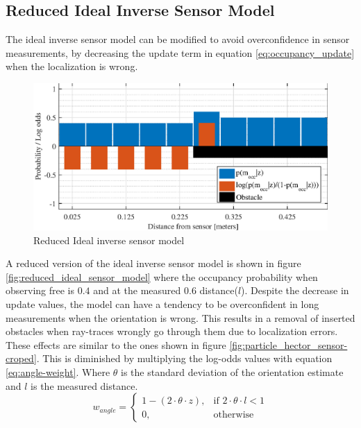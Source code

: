 \subsection{Reduced Ideal Inverse Sensor Model}
\label{sec:reduced_ideal_sensor_model}
The ideal inverse sensor model can be modified to avoid overconfidence in sensor measurements, by decreasing the update term in equation \ref{eq:occupancy_update} when the localization is wrong. 

\begin{figure}[htbp]
	\centering
	\includegraphics[scale=1]{figures/static_mapping/reduced_ideal_sensor_model}
	\caption{Reduced Ideal inverse sensor model}
	\label{fig:reduced_ideal_sensor_model}
\end{figure}

A reduced version of the ideal inverse sensor model is shown in figure \vref{fig:reduced_ideal_sensor_model} where the occupancy probability when observing free is $0.4$ and at the measured $0.6$ distance($l$). 
Despite the decrease in update values, the model can have a tendency to be overconfident in long measurements when the orientation is wrong.
This results in a removal of inserted obstacles when ray-traces wrongly go through them due to localization errors.
These effects are similar to the ones shown in figure \ref{fig:particle_hector_sensor-croped}.
This is diminished by multiplying the log-odds values with equation \vref{eq:angle-weight}.
Where \(\theta \) is the standard deviation of the orientation estimate and \(l\) is the measured distance.
\begin{equation}
\label{eq:angle-weight}
w_{angle} = 
\begin{cases}
1 - ( 2 \cdot \theta \cdot z ), & \text{if } 2 \cdot \theta \cdot l < 1\\
0, & \text{otherwise}
\end{cases}
\end{equation}

